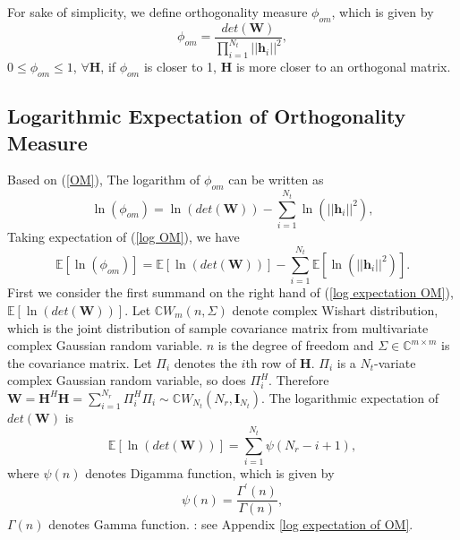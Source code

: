 \documentclass[12pt, draftclsnofoot, onecolumn]{IEEEtran}
\begin{document}
For sake of simplicity, we define orthogonality measure $\phi_{om}$, which is given by 
\begin{equation}
\phi_{om}=\frac{det(\mathbf{W})}{\prod_{i=1}^{N_{t}}||\mathbf{h}_{i}||^{2}},
\label{OM}
\end{equation}
$0\leq \phi_{om}\leq 1$, $\forall \mathbf{H}$, if $\phi_{om}$ is closer to 1, $\mathbf{H}$ is more closer to an orthogonal matrix. 
\subsection{Logarithmic Expectation of Orthogonality Measure}
Based on (\ref{OM}), The logarithm of $\phi_{om}$ can be written as 
\begin{equation}
\ln(\phi_{om})=\ln(det(\mathbf{W}))-\sum_{i=1}^{N_{t}}\ln(||\mathbf{h}_{i}||^{2}),
\label{log OM}
\end{equation}
Taking expectation of (\ref{log OM}), we have 
\begin{equation}
\mathbb{E}[\ln(\phi_{om})]=\mathbb{E}[\ln(det(\mathbf{W}))]-\sum_{i=1}^{N_{t}}\mathbb{E}[\ln(||\mathbf{h}_{i}||^{2})].
\label{log expectation OM}
\end{equation}
First we consider the first summand on the right hand of (\ref{log expectation OM}), $\mathbb{E}[\ln(det(\mathbf{W}))]$. Let $\mathbb{C}W_{m}(n, \Sigma)$ denote complex Wishart distribution, which is the joint distribution of sample covariance matrix from multivariate complex Gaussian random variable\cite{goodman1963statistical}. $n$ is the degree of freedom and $\Sigma\in \mathbb{C}^{m\times m}$ is the covariance matrix. Let $\Pi_{i}$ denotes the $i$th row of $\mathbf{H}$. $\Pi_{i}$ is a $N_{t}$-variate complex Gaussian random variable, so does $\Pi_{i}^{H}$. Therefore $\mathbf{W}=\mathbf{H}^{H}\mathbf{H}=\sum_{i=1}^{N_{r}}\Pi_{i}^{H}\Pi_{i}\sim \mathbb{C}W_{N_{t}}(N_{r}, \mathbf{I}_{N_{t}})$. The logarithmic expectation of $det(\mathbf{W})$ is
\begin{equation}
\mathbb{E}[\ln(det(\mathbf{W}))]=\sum_{i=1}^{N_{t}}\psi(N_{r}-i+1),
\label{log expectation of wishart}
\end{equation}
where $\psi(n)$ denotes Digamma function, which is given by\cite{papoulis2002probability}
\begin{equation}
\psi(n)=\frac{\Gamma^{'}(n)}{\Gamma(n)},
\label{Digmma function}
\end{equation}
$\Gamma(n)$ denotes Gamma function\cite{papoulis2002probability}.
\proof: see Appendix \ref{log expectation of OM}.
\end{document}

